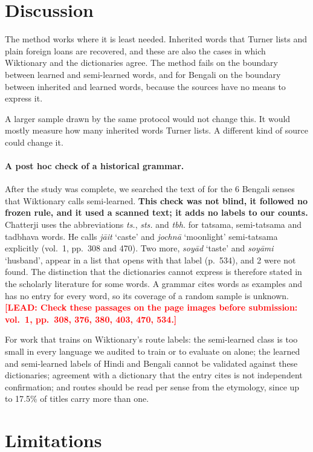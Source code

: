 \documentclass[11pt]{article}
\newcommand{\lead}[1]{\textcolor{red}{\textbf{[LEAD: #1]}}}
\newcommand{\gl}[1]{`#1'}
\begin{document}
\section{Discussion}

The method works where it is least needed. Inherited words that Turner lists and plain foreign loans are recovered, and these are also the cases in which Wiktionary and the dictionaries agree. The method fails on the boundary between learned and semi-learned words, and for Bengali on the boundary between inherited and learned words, because the sources have no means to express it.

A larger sample drawn by the same protocol would not change this. It would mostly measure how many inherited words Turner lists. A different kind of source could change it.

\paragraph{A post hoc check of a historical grammar.} After the study was complete, we searched the text of \citet{chatterji1926} for the 6 Bengali senses that Wiktionary calls semi-learned. \textbf{This check was not blind, it followed no frozen rule, and it used a scanned text; it adds no labels to our counts.} Chatterji uses the abbreviations \textit{ts.}, \textit{sts.} and \textit{tbh.} for tatsama, semi-tatsama and tadbhava words. He calls \textit{j\=ait} \gl{caste} and \textit{jochn\=a} \gl{moonlight} semi-tatsama explicitly (vol.~1, pp.~308 and 470). Two more, \textit{soy\=ad} \gl{taste} and \textit{soy\=ami} \gl{husband}, appear in a list that opens with that label (p.~534), and 2 were not found. The distinction that the dictionaries cannot express is therefore stated in the scholarly literature for some words. A grammar cites words as examples and has no entry for every word, so its coverage of a random sample is unknown. \lead{Check these passages on the page images before submission: vol.~1, pp.~308, 376, 380, 403, 470, 534.}

For work that trains on Wiktionary's route labels: the semi-learned class is too small in every language we audited to train or to evaluate on alone; the learned and semi-learned labels of Hindi and Bengali cannot be validated against these dictionaries; agreement with a dictionary that the entry cites is not independent confirmation; and routes should be read per sense from the etymology, since up to 17.5\% of titles carry more than one.

\section*{Limitations}
\end{document}
